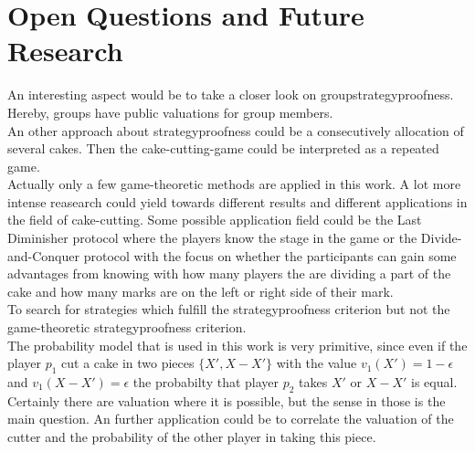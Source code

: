 \section{Open Questions and Future Research}
An interesting aspect would be to take a closer look on groupstrategyproofness. Hereby, groups have public valuations for group members.\\
\newline
An other approach about strategyproofness could be a consecutively allocation of several cakes. Then the cake-cutting-game could be interpreted as a repeated game. \\
Actually only a few game-theoretic methods are applied in this work. A lot more intense reasearch could yield towards different results and different applications in the field of cake-cutting. Some possible application field could be the Last Diminisher protocol where the players know the stage in the game or the Divide-and-Conquer protocol with the focus on whether the participants can gain some advantages from knowing with how many players the are dividing a part of the cake and how many marks are on the left or right side of their mark. \\
To search for strategies which fulfill the strategyproofness criterion but not the game-theoretic strategyproofness criterion.\\
The probability model that is used in this work is very primitive, since even if the player $p_1$ cut a cake in two pieces $\{X', X-X'\}$ with the value $v_1(X')=1-\epsilon$ and $v_1(X-X')=\epsilon$ the probabilty that player $p_2$ takes $X'$ or $X-X'$ is equal. Certainly there are valuation where it is possible, but the sense in those is the main question. An further application could be to correlate the valuation of the cutter and the probability of the other player in taking this piece. 

